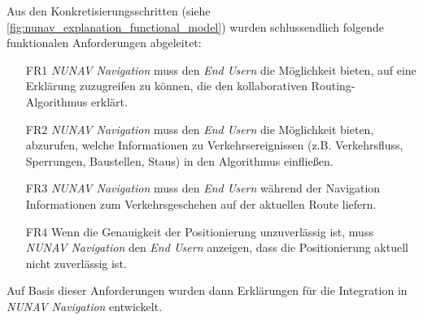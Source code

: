 \newpage

Aus den Konkretisierungsschritten (siehe \autoref{fig:nunav_explanation_functional_model}) wurden schlussendlich folgende funktionalen Anforderungen abgeleitet:

\begin{enumerate}
    \item [FR1] \textit{NUNAV Navigation} muss den \textit{End Usern} die Möglichkeit bieten, auf eine Erklärung zuzugreifen zu können, die den kollaborativen Routing-Algorithmus erklärt.
    \item [FR2] \textit{NUNAV Navigation} muss den \textit{End Usern} die Möglichkeit bieten, abzurufen, welche Informationen zu Verkehrsereignissen (z.B. Verkehrsfluss, Sperrungen, Baustellen, Staus) in den Algorithmus einfließen.
    \item [FR3] \textit{NUNAV Navigation} muss den \textit{End Usern} während der Navigation Informationen zum Verkehrsgeschehen auf der aktuellen Route liefern.
    \item [FR4] Wenn die Genauigkeit der Positionierung unzuverlässig ist, muss \textit{NUNAV Navigation} den \textit{End Usern} anzeigen, dass die Positionierung aktuell nicht zuverlässig ist.
\end{enumerate}

Auf Basis dieser Anforderungen wurden dann Erklärungen für die Integration in \textit{NUNAV Navigation} entwickelt.
